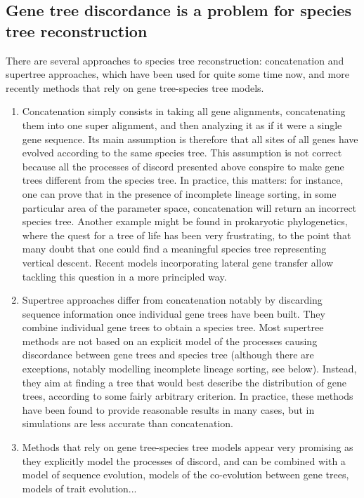 \documentclass[11pt]{article}
\begin{document}
\subsection{Gene tree discordance is a problem for species tree reconstruction}
There are several approaches to species tree reconstruction: concatenation and supertree approaches, which have been used for quite some time now, and more recently methods that rely on gene tree-species tree models.\begin{enumerate}
\item Concatenation simply consists in taking all gene alignments, concatenating them into one super alignment, and then analyzing it as if it were a single gene sequence.
Its main assumption is therefore that all sites of all genes have evolved according to the same species tree.
This assumption is not correct because all the processes of discord presented above conspire to make gene trees different from the species tree.
In practice, this matters: for instance, one can prove that in the presence of incomplete lineage sorting, in some particular area of the parameter space, concatenation will return an incorrect species tree.
Another example might be found in prokaryotic phylogenetics, where the quest for a tree of life has been very frustrating, to the point that many doubt that one could find a meaningful species tree representing vertical descent.
Recent models incorporating lateral gene transfer allow tackling this question in a more principled way.
\item Supertree approaches differ from concatenation notably by discarding sequence information once individual gene trees have been built.
They combine individual gene trees to obtain a species tree.
Most supertree methods are not based on an explicit model of the processes causing discordance between gene trees and species tree (although there are exceptions, notably modelling incomplete lineage sorting, see below).
Instead, they aim at finding a tree that would best describe the distribution of gene trees, according to some fairly arbitrary criterion.
In practice, these methods have been found to provide reasonable results in many cases, but in simulations are less accurate than concatenation.
\item Methods that rely on gene tree-species tree models appear very promising as they explicitly model the processes of discord, and can be combined with a model of sequence evolution, models of the co-evolution between gene trees, models of trait evolution... 
\end{enumerate}
\end{document}
